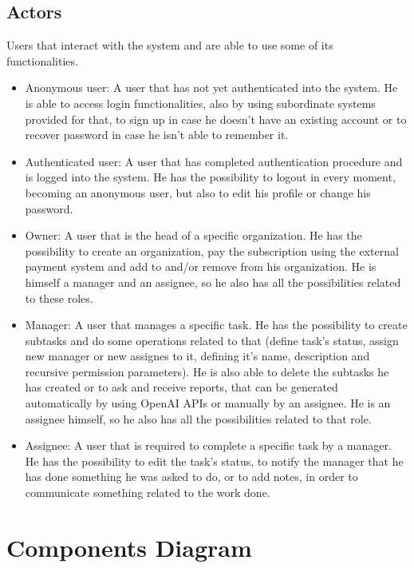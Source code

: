 \documentclass{article}
\begin{document}
\subsection{Actors}
Users that interact with the system and are able to use some of its functionalities.
\begin{itemize}
    \item Anonymous user: A user that has not yet authenticated into the system. He is able to access login functionalities, also by using subordinate systems provided for that, to sign up in case he doesn't have an existing account or to recover password in case he isn't able to remember it.
    \item Authenticated user: A user that has completed authentication procedure and is logged into the system. He has the possibility to logout in every moment, becoming an anonymous user, but also to edit his profile or change his password.
    \item Owner: A user that is the head of a specific organization. He has the possibility to create an organization, pay the subscription using the external payment system and add to and/or remove from his organization. He is himself a manager and an assignee, so he also has all the possibilities related to these roles.
    \item Manager: A user that manages a specific task. He has the possibility to create subtasks and do some operations related to that (define task's status, assign new manager or new assignes to it, defining it's name, description and recursive permission parameters). He is also able to delete the subtasks he has created or to ask and receive reports, that can be generated automatically by using OpenAI APIs or manually by an assignee. He is an assignee himself, so he also has all the possibilities related to that role.
    \item Assignee: A user that is required to complete a specific task by a manager. He has the possibility to edit the task's status, to notify the manager that he has done something he was asked to do, or to add notes, in order to communicate something related to the work done.
\end{itemize}

\section{Components Diagram}
\end{document}
